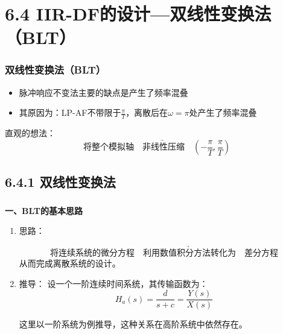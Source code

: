\documentclass[notheorems,compress,mathserif,table]{beamer}
\begin{document}
\section{6.4 IIR-DF的设计—双线性变换法（BLT）}

\begin{frame}\frametitle{双线性变换法（BLT）}%
\begin{itemize}
    \item 脉冲响应不变法主要的缺点是产生了频率混叠
    \item 其原因为：LP-AF不带限于$\frac{\pi}{T}$，离散后在$\omega = \pi$处产生了频率混叠
  \end{itemize}

   直观的想法：
   $$\mbox{将整个模拟轴}\underrightarrow{\quad\mbox{非线性压缩}\quad}
   (-\frac{\pi}{T},\frac{\pi}{T})$$
\end{frame}

\subsection{6.4.1 双线性变换法}
\begin{frame}[shrink]\frametitle{}%
\textbf{一、BLT的基本思路}


  \begin{enumerate}
    \item 思路：\par      
        $$\mbox{将连续系统的微分方程} \underrightarrow{\quad\mbox{利用数值积分方法转化为}\quad} \mbox{差分方程}$$
       从而完成离散系统的设计。
    \item 推导：
    设一个一阶连续时间系统，其传输函数为：
    $$H_a(s) = \frac{d}{s+c}=\frac{Y(s)}{X(s)}$$
    \par [注：]这里以一阶系统为例推导，这种关系在高阶系统中依然存在。\par
\end{enumerate}
\end{frame}
\end{document}
